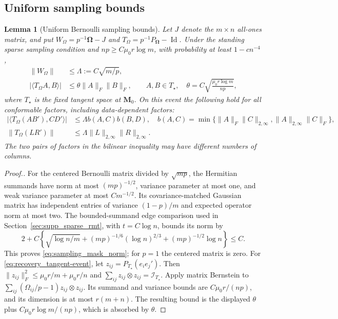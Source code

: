 \documentclass[numsec,webpdf,modern,large,namedate]{oup-authoring-template}
\theoremstyle{plain}
\newtheorem{slemma}{Lemma}%
\theoremstyle{remark}
\newcommand{\M}{\bm{M}}
\newcommand{\bOmega}{\bm{\Omega}}
\newif\ifmarkchanges
\newenvironment{revision}{\begingroup\ifmarkchanges\color{red}\fi}{\endgroup}
\begin{document}
\begin{revision}
\subsection{Uniform sampling bounds}
\label{sec:uniform_sampling}
\begin{slemma}[Uniform Bernoulli sampling bounds]
\label{lem:mask_geometry}
Let $J$ denote the $m\times n$ all-ones matrix, and put
$W_\Omega=p^{-1}\bOmega-J$ and $T_\Omega=p^{-1}P_{\bOmega}-\operatorname{Id}$.
Under the standing sparse sampling condition and $np\ge C\mu_0r\log m$,
with probability at least $1-cn^{-4}$,
\begin{align}
 \|W_\Omega\|&\le\Lambda:=C\sqrt{m/p},\label{eq:sampling_mask_norm}\\
 |\langle T_\Omega A,B\rangle|
 &\le\theta\|A\|_F\|B\|_F,\qquad A,B\in T_\star,
 \quad\theta=C\sqrt{\frac{\mu_0r\log m}{np}},
 \label{eq:recovery_tangent-event}
\end{align}
where $T_\star$ is the fixed tangent space at $\M_0$.
On this event the following hold for all conformable factors, including
data-dependent factors:
\begin{align}
 |\langle T_\Omega(AB'),CD'\rangle|
 &\le\Lambda b(A,C)b(B,D),
 \quad b(A,C)=\min\{\|A\|_F\|C\|_{2,\infty},
                            \|A\|_{2,\infty}\|C\|_F\},
 \label{eq:recovery_bilinear-event}\\
 \|T_\Omega(LR')\|
 &\le\Lambda\|L\|_{2,\infty}\|R\|_{2,\infty}.
 \label{eq:sampling_schur_bound}
\end{align}
The two pairs of factors in the bilinear inequality may have different
numbers of columns.
\end{slemma}
\begin{proof}[Proof.]
For the centered Bernoulli matrix divided by $\sqrt{mp}$, the Hermitian
summands have norm at most $(mp)^{-1/2}$, variance parameter at most one,
and weak variance parameter at most $Cm^{-1/2}$.  Its covariance-matched
Gaussian matrix has independent entries of variance $(1-p)/m$ and expected
operator norm at most two.  The bounded-summand edge comparison used in
Section~\ref{sec:supp_sparse_rmt}, with $t=C\log n$, bounds its norm by
\[
 2+C\left\{\sqrt{\log n/m}+(mp)^{-1/6}(\log n)^{2/3}
                  +(mp)^{-1/2}\log n\right\}\le C.
\]
This proves \eqref{eq:sampling_mask_norm}; for $p=1$ the centered matrix is zero.
For \eqref{eq:recovery_tangent-event}, let $z_{ij}=P_{T_\star}(e_ie_j')$.
Then $\|z_{ij}\|_F^2\le\mu_0r/m+\mu_0r/n$ and
$\sum_{ij}z_{ij}\otimes z_{ij}=\mathcal I_{T_\star}$.
Apply matrix Bernstein \citep{tropp2012userfriendly} to
$\sum_{ij}(\Omega_{ij}/p-1)z_{ij}\otimes z_{ij}$.
Its summand and variance bounds are $C\mu_0r/(np)$, and its dimension
is at most $r(m+n)$.  The resulting bound is the displayed $\theta$
plus $C\mu_0r\log m/(np)$, which is absorbed by $\theta$.


\end{proof}
\end{revision}
\end{document}
